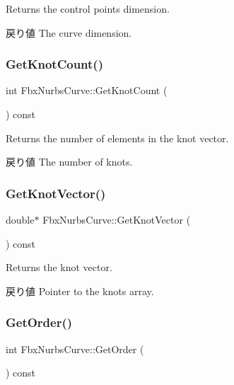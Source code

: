 Returns the control points dimension. \begin{DoxyReturn}{戻り値}
The curve dimension. 
\end{DoxyReturn}
\mbox{\label{class_fbx_nurbs_curve_a6201a71ed5ff2c6a5a467cc78d15c72f}} 
\subsubsection{\texorpdfstring{Get\+Knot\+Count()}{GetKnotCount()}}
{\footnotesize\ttfamily int Fbx\+Nurbs\+Curve\+::\+Get\+Knot\+Count (\begin{DoxyParamCaption}{ }\end{DoxyParamCaption}) const}

Returns the number of elements in the knot vector. \begin{DoxyReturn}{戻り値}
The number of knots. 
\end{DoxyReturn}
\mbox{\label{class_fbx_nurbs_curve_af90ec7ee0a8bc25834d30242afeb9e00}} 
\subsubsection{\texorpdfstring{Get\+Knot\+Vector()}{GetKnotVector()}}
{\footnotesize\ttfamily double$\ast$ Fbx\+Nurbs\+Curve\+::\+Get\+Knot\+Vector (\begin{DoxyParamCaption}{ }\end{DoxyParamCaption}) const}

Returns the knot vector. \begin{DoxyReturn}{戻り値}
Pointer to the knots array. 
\end{DoxyReturn}
\mbox{\label{class_fbx_nurbs_curve_a1cbad4f23956e5395916d45b807854f4}} 
\subsubsection{\texorpdfstring{Get\+Order()}{GetOrder()}}
{\footnotesize\ttfamily int Fbx\+Nurbs\+Curve\+::\+Get\+Order (\begin{DoxyParamCaption}{ }\end{DoxyParamCaption}) const}

